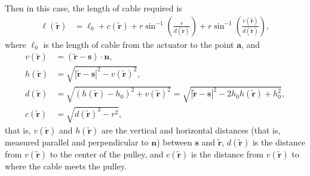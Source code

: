 \documentclass[reqno,12pt]{amsart}
\begin{document}
Then in this case, the length of cable required is
\begin{equation}
\label{example ell}
\begin{aligned}
\ell(\tilde{\bm r}) &= \ell_0 + c(\tilde{\bm r})
+ r \sin^{-1} \left(\frac{r}{d(\tilde{\bm r})} \right)
+ r \sin^{-1} \left(\frac{v(\tilde{\bm r})}{d(\tilde{\bm r})} \right) 
,
\end{aligned}
\end{equation}
where $\ell_0$ is the length of cable from the actuator to the point $\bm a$, and
\begin{align}
v(\tilde{\bm r}) &= (\tilde{\bm r} - \bm s) \cdot \bm n ,\\
h(\tilde{\bm r}) &= \sqrt{|\tilde{\bm r} - \bm s|^2 - v(\tilde{\bm r})^2}, \\
d(\tilde{\bm r}) &= \sqrt{(h(\tilde{\bm r}) - h_0)^2 + v(\tilde{\bm r})^2} = \sqrt{|\tilde{\bm r} - \bm s|^2 - 2 h_0 h(\tilde{\bm r}) + h_0^2} ,
\\
c(\tilde{\bm r}) &= \sqrt{d(\tilde{\bm r})^2 - r^2} ,
\end{align}
that is,
$v(\tilde{\bm r})$ and $h(\tilde{\bm r})$ are the vertical and horizontal distances (that is, measured parallel and perpendicular to $\bm n$) between $\bm s$ and $\tilde{\bm r}$,
$d(\tilde{\bm r})$ is the distance from $v(\tilde{\bm r})$ to the center of the pulley, and $c(\tilde{\bm r})$ is the distance from $v(\tilde{\bm r})$ to where the cable meets the pulley.
\end{document}
